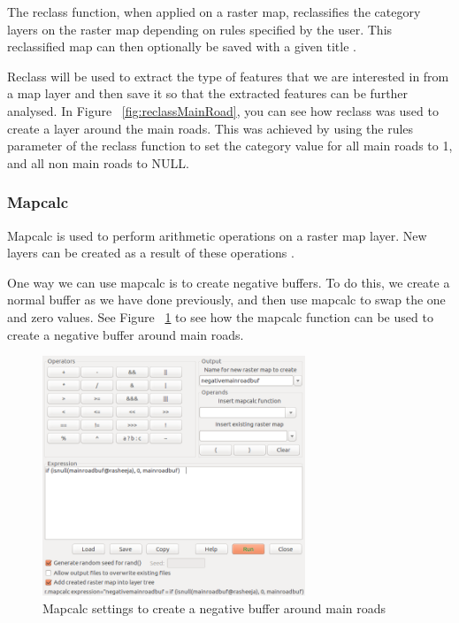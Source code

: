 \documentclass[a4paper,11pt,parskip]{scrartcl}
\begin{document}
The reclass function, when applied on a raster map, reclassifies the category layers on the raster map
depending on rules specified by the user. This reclassified map can then optionally be saved with a
given title \parencite{manualReclass}.

Reclass will be used to extract the type of features that we are interested in from a map layer and then
save it so that the extracted features can be further analysed. In Figure ~\ref{fig:reclassMainRoad}, you can
see how reclass was used to create a layer around the main roads. This was achieved by using the rules parameter
of the reclass function to set the category value for all main roads to 1, and all non main roads to NULL.

\subsubsection{Mapcalc}

Mapcalc is used to perform arithmetic operations on a raster map layer. New layers can be created as a result
of these operations \parencite{manualMapcalc}.

One way we can use mapcalc is to create negative buffers. To do this, we create a normal buffer as we have
done previously, and then use mapcalc to swap the one and zero values. See Figure ~\ref{fig:mapcalcMainRoad}
to see how the mapcalc function can be used to create a negative buffer around main roads.

\begin{figure}[H]
  \centering
  \includegraphics[width=0.7\textwidth]{pictures/mapcalcMainRoad.png}
  \caption{Mapcalc settings to create a negative buffer around main roads}
  \label{fig:mapcalcMainRoad}
\end{figure}
\end{document}
